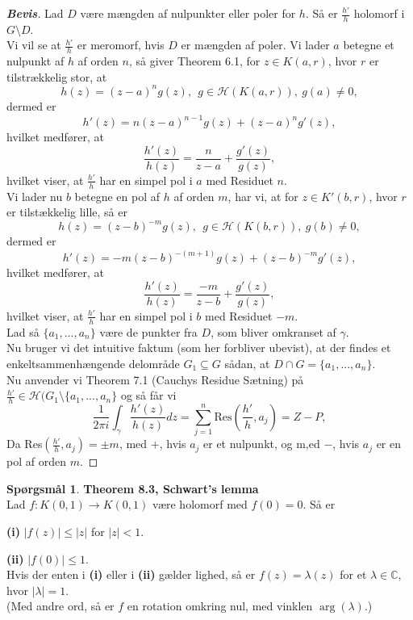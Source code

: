 \documentclass[10pt,a4paper]{article}
\theoremstyle{definition}
\newtheorem{Prob}{Spørgsmål}
\begin{document}
\newpage
\begin{proof}[\textbf{Bevis}]
Lad $D$ være mængden af nulpunkter eller poler for $h$. Så er $\frac{h'}{h}$ holomorf i $G \setminus D$. \\
Vi vil se at $\frac{h'}{h}$ er meromorf, hvis $D$ er mængden af poler. Vi lader $a$ betegne et nulpunkt af $h$ af orden $n$, så giver Theorem 6.1, for $z \in K(a,r)$, hvor $r$ er tilstrækkelig stor, at
$$h(z) = (z-a)^n g(z), \ \ g \in \mathcal{H}(K(a,r)), \ g(a)\neq 0,$$
dermed er
$$h'(z) = n(z-a)^{n-1}g(z) + (z-a)^ng'(z),$$
hvilket medfører, at
$$\frac{h'(z)}{h(z)} = \frac{n}{z-a} + \frac{g'(z)}{g(z)},$$
hvilket viser, at $\frac{h'}{h}$ har en simpel pol i $a$ med Residuet $n$. \\

Vi lader nu $b$ betegne en pol af $h$ af orden $m$, har vi, at for $z \in K'(b,r)$, hvor $r$ er tilstækkelig lille, så er
$$h(z) = (z-b)^{-m}g(z), \ \ g \in \mathcal{H}(K(b,r)), \ g(b) \neq 0,$$
dermed er
$$h'(z) = -m(z-b)^{-(m+1)}g(z) + (z-b)^{-m} g'(z),$$
hvilket medfører, at
$$\frac{h'(z)}{h(z)} = \frac{-m}{z-b} + \frac{g'(z)}{g(z)},$$
hvilket viser, at $\frac{h'}{h}$ har en simpel pol i $b$ med Residuet $-m$. \\

Lad så $\{a_1,...,a_n\}$ være de punkter fra $D$, som bliver omkranset af $\gamma$. \\
Nu bruger vi det intuitive faktum (som her forbliver ubevist), at der findes et enkeltsammenhængende delområde $G_1 \subseteq G$ sådan, at $D \cap G = \{a_1,...,a_n\}$. \\
Nu anvender vi Theorem 7.1 (Cauchys Residue Sætning) på $\frac{h'}{h} \in \mathcal{H}(G_1 \setminus \{a_1,...,a_n\}$ og så får vi
$$\frac{1}{2\pi i} \int_\gamma \frac{h'(z)}{h(z)}dz = \sum\limits_{j=1}^n \text{Res}(\frac{h'}{h},a_j) = Z-P,$$
Da Res$(\frac{h'}{h},a_j) = \pm m$, med $+$, hvis $a_j$ er et nulpunkt, og m,ed $-$, hvis $a_j$ er en pol af orden $m$.
\end{proof}






\newpage
\begin{Prob}{\textbf{Theorem 8.3, Schwart's lemma}} \\

Lad $f:K(0,1) \rightarrow K(0,1)$ være holomorf med $f(0)=0$. Så er \\
\item[\textbf{(i)}] $|f(z)| \leq |z|$ for $|z|<1$.
\item[\textbf{(ii)}] $|f(0)| \leq 1$. \\

Hvis der enten i \textbf{(i)} eller i \textbf{(ii)} gælder lighed, så er $f(z) = \lambda(z)$ for et $\lambda \in \mathbb{C}$, hvor $|\lambda| =1$. \\
(Med andre ord, så er $f$ en rotation omkring nul, med vinklen $\arg(\lambda)$.)
\end{Prob}
\end{document}
